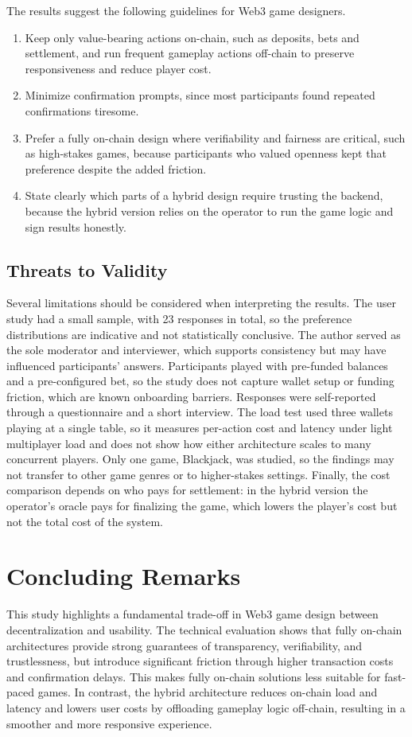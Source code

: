 \documentclass[10pt,conference]{IEEEtran}
\begin{document}
The results suggest the following guidelines for Web3 game designers.
\begin{enumerate}
    \item Keep only value-bearing actions on-chain, such as deposits, bets and settlement, and run frequent gameplay actions off-chain to preserve responsiveness and reduce player cost.
    \item Minimize confirmation prompts, since most participants found repeated confirmations tiresome.
    \item Prefer a fully on-chain design where verifiability and fairness are critical, such as high-stakes games, because participants who valued openness kept that preference despite the added friction.
    \item State clearly which parts of a hybrid design require trusting the backend, because the hybrid version relies on the operator to run the game logic and sign results honestly.
\end{enumerate}

\subsection{Threats to Validity}
Several limitations should be considered when interpreting the results. The user study had a small sample, with 23 responses in total, so the preference distributions are indicative and not statistically conclusive. The author served as the sole moderator and interviewer, which supports consistency but may have influenced participants' answers. Participants played with pre-funded balances and a pre-configured bet, so the study does not capture wallet setup or funding friction, which are known onboarding barriers. Responses were self-reported through a questionnaire and a short interview. The load test used three wallets playing at a single table, so it measures per-action cost and latency under light multiplayer load and does not show how either architecture scales to many concurrent players. Only one game, Blackjack, was studied, so the findings may not transfer to other game genres or to higher-stakes settings. Finally, the cost comparison depends on who pays for settlement: in the hybrid version the operator's oracle pays for finalizing the game, which lowers the player's cost but not the total cost of the system.

\section{Concluding Remarks}\label{sec:conclusion}
This study highlights a fundamental trade-off in Web3 game design between decentralization and usability. The technical evaluation shows that fully on-chain architectures provide strong guarantees of transparency, verifiability, and trustlessness, but introduce significant friction through higher transaction costs and confirmation delays. This makes fully on-chain solutions less suitable for fast-paced games. In contrast, the hybrid architecture reduces on-chain load and latency and lowers user costs by offloading gameplay logic off-chain, resulting in a smoother and more responsive experience.
\end{document}
